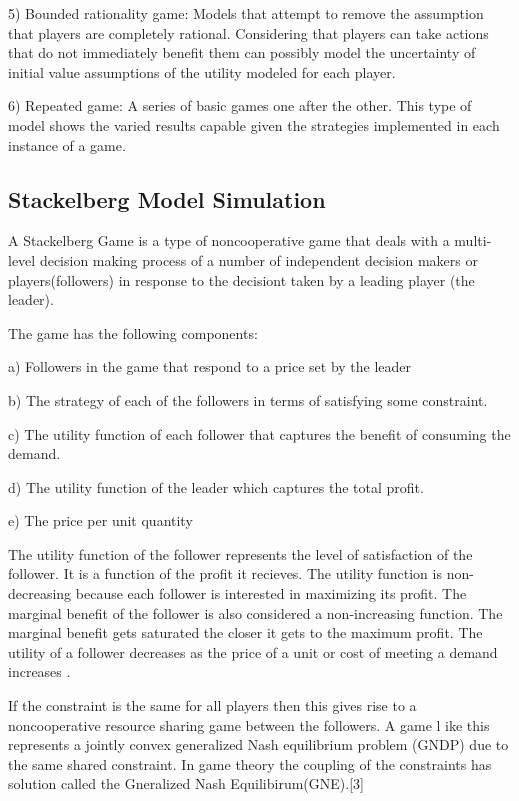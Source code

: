 5) Bounded rationality game: Models that attempt to remove the assumption
that players are completely rational. Considering that players can take
actions that do not immediately benefit them can possibly model the 
uncertainty of initial value assumptions of the utility modeled for each player.

6) Repeated game: A series of basic games one after the other. This type of 
model shows the varied results capable given the strategies implemented in 
each instance of a game.

\subsection{Stackelberg Model Simulation}
A Stackelberg Game is a type of noncooperative game that deals with a 
multi-level decision making process of a number of independent decision 
makers or players(followers) in response to the decisiont taken by a 
leading player (the leader).

The game has the following components:

a) Followers in the game that respond to a price set by the leader

b) The strategy of each of the followers in terms of satisfying 
some constraint.

c) The utility function of each follower that captures the benefit 
of consuming the demand.

d) The utility function of the leader which captures the total profit.

e) The price per unit quantity

The utility function of the follower represents the level of 
satisfaction of the follower. It is a function of the profit it recieves. 
The utility function is non-decreasing because each follower is 
interested in maximizing its profit. The marginal benefit of the 
follower is also considered a non-increasing function. The marginal 
benefit gets saturated the closer it gets to the maximum profit. 
The utility of a follower decreases as the price of a unit or cost 
of meeting a demand increases .

If the constraint is the same for all players then this gives rise to 
a noncooperative resource sharing game between the followers. A game l
ike this represents a jointly convex generalized Nash equilibrium 
problem (GNDP) due to the same shared constraint. In game theory the 
coupling of the constraints has solution called the Gneralized Nash 
Equilibirum(GNE).[3]

